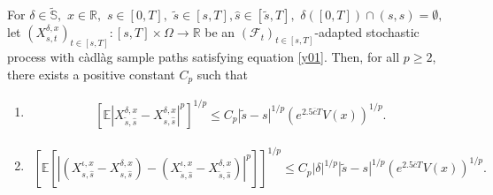 \documentclass[10pt,a4paper]{amsart}
\newcommand{\bR}{\mathbb{R}}
\newcommand{\mf}{\mathcal{F}}
\begin{document}
\begin{Lem}
\label{Lem3.5}
For $\delta \in \widetilde{\mathbb{S}},$ $x \in \bR,$ $s\in [0, T],$ $\widetilde{s} \in [s, T], \widehat{s} \in [\widetilde{s},T],$ $\delta([0, T])\cap (s, \widehat{s}) = \emptyset,$ let $(X^{\delta,x}_{s,t})_{t\in[s,T]}:[s,T]  \times\Omega\to\mathbb{R} $ 
be an $(\mf_t)_{t\in[s,T]}$-adapted stochastic process with c\`adl\`ag  sample paths satisfying equation \eqref{y01}. 
Then, for all $p \ge 2$, there exists a positive constant $C_p$ such that 
\begin{enumerate}
     \item [\textup{(i)}]
    \begin{align*}
        \left[\mathbb{E}\left|X^{\delta, x}_{\widetilde{s},\widehat{s}}-X^{\delta, x}_{s,\widehat{s}}\right|^p\right]^{1/p} 
 \leq C_p |\widetilde{s} -s|^{1/p} (e^{2.5\overline{c}T}V(x))^{1/p}. 
 \end{align*}
 \item [\textup{(ii)}]
 \begin{align*}
\left[\mathbb{E}\left[\left|\left(X^{\iota, x}_{s,\widehat{s}}-X^{\delta,x}_{s,\widehat{s}}\right) - \left(X^{\iota, x}_{\widetilde{s},\widehat{s}}-X^{\delta, x}_{\widetilde{s},\widehat{s}}\right)\right|^p\right]\right]^{1/p}  
   \leq C_p |\delta|^{1/p} |\widetilde{s} -s|^{1/p} (e^{2.5\overline{c}T}V(x))^{1/p}.
   \end{align*}
\end{enumerate}
\end{Lem}
\end{document}
